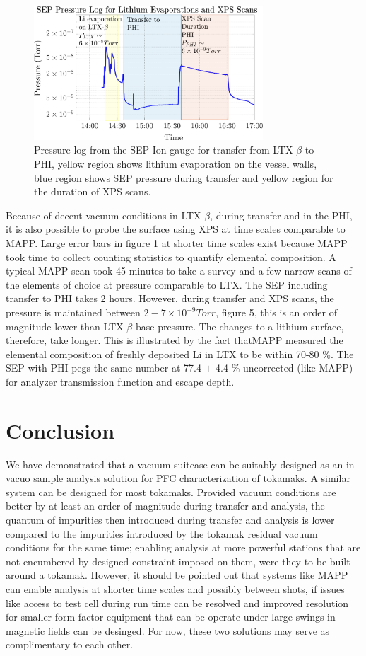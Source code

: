 \documentclass[%
 aip,
 amsmath,amssymb,
 reprint,%
]{revtex4-1}
\begin{document}
\begin{figure}%
\centering
\includegraphics[width=3.37in,keepaspectratio]{04012019_Transferlog}%
\caption{Pressure log from the SEP Ion gauge for transfer from LTX-$\beta$ to PHI, yellow region shows lithium evaporation on the vessel walls, blue region shows SEP pressure during transfer and yellow region for the duration of XPS scans.}
\end{figure}

Because of decent vacuum conditions in LTX-$\beta$, during transfer and in the PHI, it is also possible to probe the surface using XPS at time scales comparable to MAPP. Large error bars in figure 1 at shorter time scales exist because MAPP took time to collect counting statistics to quantify elemental composition. A typical MAPP scan took 45 minutes to take a survey and a few narrow scans of the elements of choice at pressure comparable to LTX. The SEP including transfer to PHI takes 2 hours. However, during transfer and XPS scans, the pressure is maintained between $2-7 \times 10^{-9} Torr$, figure 5, this is an order of magnitude lower than LTX-$\beta$ base pressure. The changes to a lithium surface, therefore, take longer. This is illustrated by the fact thatMAPP measured the elemental composition of freshly deposited Li in LTX to be within 70-80 \%. The SEP with PHI pegs the same number at 77.4 $\pm$ 4.4 \% uncorrected (like MAPP) for analyzer transmission function and escape depth.

\section{Conclusion}

We have demonstrated that a vacuum suitcase can be suitably designed as an in-vacuo sample analysis solution for PFC characterization of tokamaks. A similar system can be designed for most tokamaks. Provided vacuum conditions are better by at-least an order of magnitude during transfer and analysis, the quantum of impurities then introduced during transfer and analysis is lower compared to the impurities introduced by the tokamak residual vacuum conditions for the same time; enabling analysis at more powerful stations that are not encumbered by designed constraint imposed on them, were they to be built around a tokamak. However, it should be pointed out that systems like MAPP can enable analysis at shorter time scales and possibly between shots, if issues like access to test cell during run time can be resolved and improved resolution for smaller form factor equipment that can be operate under large swings in magnetic fields can be desinged. For now, these two solutions may serve as complimentary to each other.  
\end{document}
